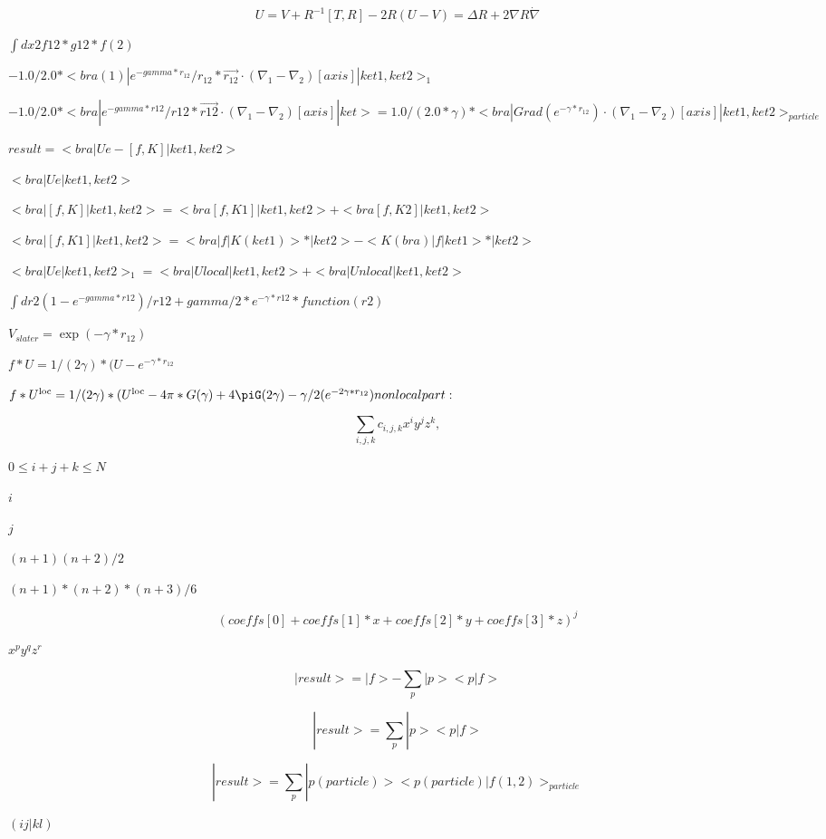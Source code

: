 \documentclass{article}
\begin{document}
\[ U=V + R^{-1}[T,R] -2 R (U-V) = \Delta R + 2\nabla R\dot \nabla \]
\pagebreak

$ \int dx2 f12*g12*f(2) $
\pagebreak

$ -1.0/2.0*<bra(1)|e^{-gamma*r_{12}}/r_{12}* \vec{r_{12}}\cdot (\nabla_1 - \nabla_2)[axis]|ket1,ket2>_1 $
\pagebreak

$ -1.0/2.0*<bra|e^{-gamma*r12}/r12* \vec{r12}\cdot (\nabla_1 - \nabla_2)[axis]|ket> = 1.0/(2.0*\gamma)*<bra|Grad(e^{-\gamma*r_{12}})\cdot (\nabla_1 - \nabla_2)[axis]|ket1,ket2>_{particle} $
\pagebreak

$ result = <bra|Ue-[f,K]|ket1,ket2> $
\pagebreak

$ <bra|Ue|ket1,ket2> $
\pagebreak

$ <bra|[f,K]|ket1,ket2> = <bra[f,K1]|ket1,ket2> + <bra[f,K2]|ket1,ket2> $
\pagebreak

$ <bra|[f,K1]|ket1,ket2> = <bra|f|K(ket1)>*|ket2> - <K(bra)|f|ket1>*|ket2> $
\pagebreak

$ <bra|Ue|ket1,ket2>_1 = <bra|Ulocal|ket1,ket2> + <bra|Unlocal|ket1,ket2> $
\pagebreak

$ \int dr2 (1-e^{-gamma*r12})/r12 + gamma/2* e^{-\gamma*r12} *function(r2) $
\pagebreak

$ V_{slater} = \exp{(-\gamma*r_{12})} $
\pagebreak

$ f*U = 1/(2\gamma)*(U - e^{-\gamma*r_{12}} $
\pagebreak

$ f*U^{\text{loc}} = 1/(2\gamma)*(U^{\text{loc}} - 4\pi*G(\gamma) + 4\piG(2\gamma) - \gamma/2 (e^{-2\gamma*r_{12}} ) nonlocal part: $
\pagebreak

\[ \sum_{i,j,k} c_{i,j,k} x^i y^j z^k, \]
\pagebreak

$0\le i+j+k\le N$
\pagebreak

$i$
\pagebreak

$j$
\pagebreak

$(n+1)(n+2)/2$
\pagebreak

$(n+1)*(n+2)*(n+3)/6$
\pagebreak

\[ (coeffs[0] + coeffs[1]*x + coeffs[2]*y + coeffs[3]*z)^j \]
\pagebreak

$x^p y^q z^r$
\pagebreak

\[ |result> = |f> - \sum_p |p><p|f> \]
\pagebreak

\[ | result > = \sum_p | p > <p|f> \]
\pagebreak

\[ |result> = \sum_p |p(particle)> <p(particle)|f(1,2)>_{particle} \]
\pagebreak

$(ij|kl)$
\pagebreak
\end{document}
